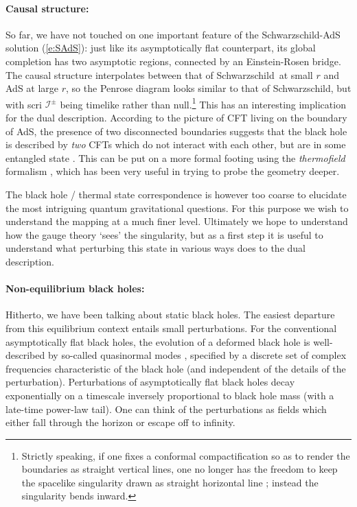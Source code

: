 \documentclass[12pt]{article}
\def\req#1{(\ref{#1})}
\def\schw{Schwarzschild}
\def\scri{\mathscr I}
\begin{document}
\paragraph{Causal structure:}  %
So far, we have not touched on one important feature of the  \schw-AdS solution \req{e:SAdS}: just like its asymptotically flat counterpart, its global completion has two asymptotic regions, connected by an Einstein-Rosen bridge.
The causal structure interpolates between that of \schw\ at small $r$ and AdS at large $r$, so the Penrose diagram looks similar to that of \schw, but with scri $\scri^\pm$ being timelike rather than null.\footnote{
Strictly speaking, if one fixes a conformal compactification so as to render the boundaries as straight vertical lines, one no longer has the freedom to keep the spacelike singularity drawn as straight horizontal line \cite{Fidkowski:2003nf}; instead the singularity bends inward.
}
This has an interesting implication for the dual description.  According to the picture of CFT living on the boundary of AdS, the presence of two disconnected boundaries suggests that the black hole is described by {\it two} CFTs which do not interact with each other, but are in some entangled state \cite{Maldacena:2001kr}.  This can be put on a more formal footing using the {\it thermofield} formalism \cite{israel1976thermo}, which has been very useful in trying to probe the geometry deeper.

The black hole / thermal state correspondence is however too coarse to elucidate the most intriguing quantum gravitational questions.  For this purpose we wish to understand the mapping at a much finer level.  Ultimately we hope to understand how the gauge theory `sees' the singularity, but as a first step it is useful to understand what perturbing this state in various ways does to the dual description.

\paragraph{Non-equilibrium black holes:}  %
Hitherto, we have been talking about static black holes.  The easiest departure from this equilibrium context entails small perturbations.  For the conventional asymptotically flat black holes, the  evolution of a deformed black hole is  well-described by so-called quasinormal modes \cite{Kokkotas:1999bd}, specified by a discrete set of complex frequencies characteristic of the black hole (and independent of the details of the perturbation).
Perturbations of asymptotically flat black holes decay exponentially on a timescale inversely proportional to black hole mass (with a late-time power-law tail).  One can think of the perturbations as fields which either fall through the horizon or escape off to infinity.  
\end{document}
